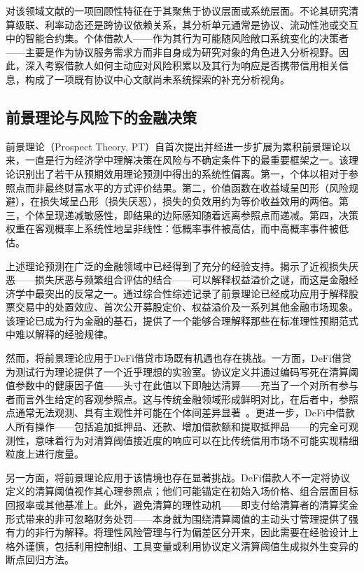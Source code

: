 对该领域文献的一项回顾性特征在于其聚焦于协议层面或系统层面。不论其研究清算级联、利率动态还是跨协议依赖关系，其分析单元通常是协议、流动性池或交互中的智能合约集。个体借款人——作为其行为可能随风险敞口系统变化的决策者——主要是作为协议服务需求方而非自身成为研究对象的角色进入分析视野。因此，深入考察借款人如何主动应对风险积累以及其行为响应是否携带信用相关信息，构成了一项既有协议中心文献尚未系统探索的补充分析视角。

\subsection{前景理论与风险下的金融决策}

前景理论（Prospect Theory, PT）自\citet{kahneman1979prospect}首次提出并经\citet{tversky1992advances}进一步扩展为累积前景理论以来，一直是行为经济学中理解决策在风险与不确定条件下的最重要框架之一。该理论识别出了若干从预期效用理论预测中得出的系统性偏离。第一，个体以相对于参照点而非最终财富水平的方式评价结果。第二，价值函数在收益域呈凹形（风险规避），在损失域呈凸形（损失厌恶），损失的负效用约为等价收益效用的两倍。第三，个体呈现递减敏感性，即结果的边际感知随着远离参照点而递减。第四，决策权重在客观概率上系统性地呈非线性：低概率事件被高估，而中高概率事件被低估。

上述理论预测在广泛的金融领域中已经得到了充分的经验支持。\citet{benartzi1995myopic}揭示了近视损失厌恶——损失厌恶与频繁组合评估的结合——可以解释权益溢价之谜，而这是金融经济学中最突出的反常之一。\citet{barberis2013thirty}通过综合性综述记录了前景理论已经成功应用于解释股票交易中的处置效应、首次公开募股定价、权益溢价及一系列其他金融市场现象。该理论已成为行为金融的基石，提供了一个能够合理解释那些在标准理性预期范式中难以解释的经验规律。

然而，将前景理论应用于DeFi借贷市场既有机遇也存在挑战。一方面，DeFi借贷为测试行为理论提供了一个近乎理想的实验室。协议定义并通过编码写死在清算阈值参数中的健康因子值——头寸在此值以下即触达清算——充当了一个对所有参与者而言外生给定的客观参照点。这与传统金融领域形成鲜明对比，在后者中，参照点通常无法观测、具有主观性并可能在个体间差异显著~\cite{barberis2013thirty}。更进一步，DeFi中借款人所有操作——包括追加抵押品、还款、增加借款额和提取抵押品——的完全可观测性，意味着行为对清算阈值接近度的响应可以在比传统信用市场不可能实现精细粒度上进行度量。

另一方面，将前景理论应用于该情境也存在显著挑战。DeFi借款人不一定将协议定义的清算阈值视作其心理参照点；他们可能锚定在初始入场价格、组合层面目标回报率或其他基准上。此外，避免清算的理性动机——即支付给清算者的清算奖金形式带来的非可忽略财务处罚——本身就为围绕清算阈值的主动头寸管理提供了强有力的非行为解释。将理性风险管理与行为偏差区分开来，因此需要在经验设计上格外谨慎，包括利用控制组、工具变量或利用协议定义清算阈值生成拟外生变异的断点回归方法。

